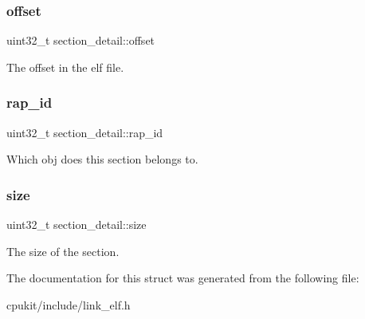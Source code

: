 \subsubsection{\texorpdfstring{offset}{offset}}
{\footnotesize\ttfamily uint32\+\_\+t section\+\_\+detail\+::offset}

The offset in the elf file. \mbox{\label{structsection__detail_a5963558402c0ef2d45a41fd3d6a4d49d}} 
\subsubsection{\texorpdfstring{rap\_id}{rap\_id}}
{\footnotesize\ttfamily uint32\+\_\+t section\+\_\+detail\+::rap\+\_\+id}

Which obj does this section belongs to. \mbox{\label{structsection__detail_a4d486d3842f29a57e365f3c4d8328221}} 
\subsubsection{\texorpdfstring{size}{size}}
{\footnotesize\ttfamily uint32\+\_\+t section\+\_\+detail\+::size}

The size of the section. 

The documentation for this struct was generated from the following file\+:\begin{DoxyCompactItemize}
\item 
cpukit/include/link\+\_\+elf.\+h\end{DoxyCompactItemize}
